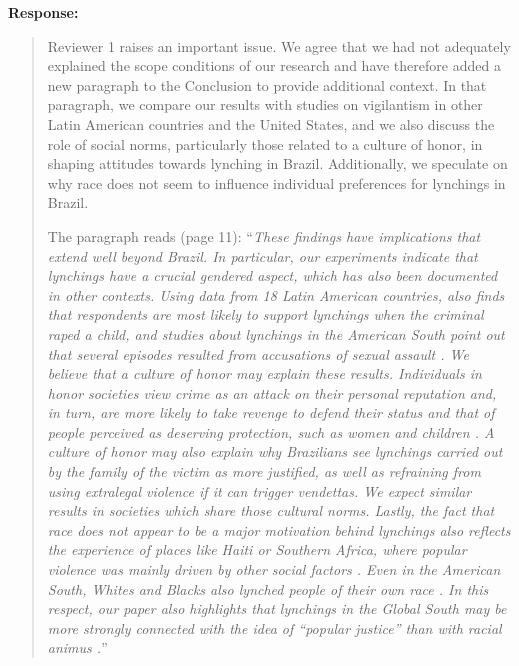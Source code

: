 \documentclass[a4paper,12pt]{article}
\begin{document}
\noindent \textbf{Response:} 

\begin{quote}
 
Reviewer 1 raises an important issue. We agree that we had not adequately
explained the scope conditions of our research and have therefore added a new
paragraph to the Conclusion to provide additional context. In that paragraph,
we compare our results with studies on vigilantism in other Latin American
countries and the United States, and we also discuss the role of social norms,
particularly those related to a culture of honor, in shaping attitudes towards
lynching in Brazil. Additionally, we speculate on why race does not seem to
influence individual preferences for lynchings in Brazil.

The paragraph reads (page 11): ``\textit{These findings have implications that
  extend well beyond Brazil. In particular, our experiments indicate that
  lynchings have a crucial gendered aspect, which has also been documented in
  other contexts. Using data from 18 Latin American countries,
  \citet{nivette2016institutional} also finds that respondents are most likely
  to support lynchings when the criminal raped a child, and studies about
  lynchings in the American South point out that several episodes resulted from
  accusations of sexual assault \citep{jacquet2013giles, smaangs2020race}. We
  believe that a culture of honor may explain these results. Individuals in
  honor societies view crime as an attack on their personal reputation and, in
  turn, are more likely to take revenge to defend their status and that of
  people perceived as deserving protection, such as women and children
  \citep{nisbett2018culture}. A culture of honor may also explain why
  Brazilians see lynchings carried out by the family of the victim as more
  justified, as well as refraining from using extralegal violence if it can
  trigger vendettas. We expect similar results in societies which share those
  cultural norms. Lastly, the fact that race does not appear to be a major
  motivation behind lynchings also reflects the experience of places like Haiti
  or Southern Africa, where popular violence was mainly driven by other social
  factors \citep{berg2011globalizing, jung2020lynching}. Even in the American
  South, Whites and Blacks also lynched people of their own race
  \citep{beck1997race}. In this respect, our paper also highlights that
lynchings in the Global South may be more strongly connected with the idea of
``popular justice'' than with racial animus \citep{martins2015linchamentos}.}''


\end{quote}
\end{document}
